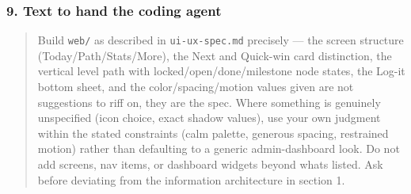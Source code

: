 \hypertarget{ui-ux-spec-9-text-to-hand-the-coding-agent}{%
\subsubsection{9. Text to hand the coding
agent}\label{ui-ux-spec-9-text-to-hand-the-coding-agent}}

\begin{quote}
Build \texttt{web/} as described in \texttt{ui-ux-spec.md} precisely ---
the screen structure (Today/Path/Stats/More), the Next and Quick-win
card distinction, the vertical level path with
locked/open/done/milestone node states, the Log-it bottom sheet, and the
color/spacing/motion values given are not suggestions to riff on, they
are the spec. Where something is genuinely unspecified (icon choice,
exact shadow values), use your own judgment within the stated
constraints (calm palette, generous spacing, restrained motion) rather
than defaulting to a generic admin-dashboard look. Do not add screens,
nav items, or dashboard widgets beyond what\textquotesingle s listed.
Ask before deviating from the information architecture in section 1.
\end{quote}
